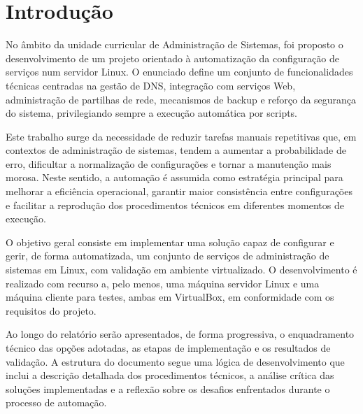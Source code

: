 \chapter{Introdução}
\label{intro}

No âmbito da unidade curricular de Administração de Sistemas, foi proposto o desenvolvimento de um projeto orientado à automatização da configuração de serviços num servidor Linux. O enunciado define um conjunto de funcionalidades técnicas centradas na gestão de DNS, integração com serviços Web, administração de partilhas de rede, mecanismos de backup e reforço da segurança do sistema, privilegiando sempre a execução automática por scripts.

Este trabalho surge da necessidade de reduzir tarefas manuais repetitivas que, em contextos de administração de sistemas, tendem a aumentar a probabilidade de erro, dificultar a normalização de configurações e tornar a manutenção mais morosa. Neste sentido, a automação é assumida como estratégia principal para melhorar a eficiência operacional, garantir maior consistência entre configurações e facilitar a reprodução dos procedimentos técnicos em diferentes momentos de execução.

O objetivo geral consiste em implementar uma solução capaz de configurar e gerir, de forma automatizada, um conjunto de serviços de administração de sistemas em Linux, com validação em ambiente virtualizado. O desenvolvimento é realizado com recurso a, pelo menos, uma máquina servidor Linux e uma máquina cliente para testes, ambas em VirtualBox, em conformidade com os requisitos do projeto.

Ao longo do relatório serão apresentados, de forma progressiva, o enquadramento técnico das opções adotadas, as etapas de implementação e os resultados de validação. A estrutura do documento segue uma lógica de desenvolvimento que inclui a descrição detalhada dos procedimentos técnicos, a análise crítica das soluções implementadas e a reflexão sobre os desafios enfrentados durante o processo de automação.
